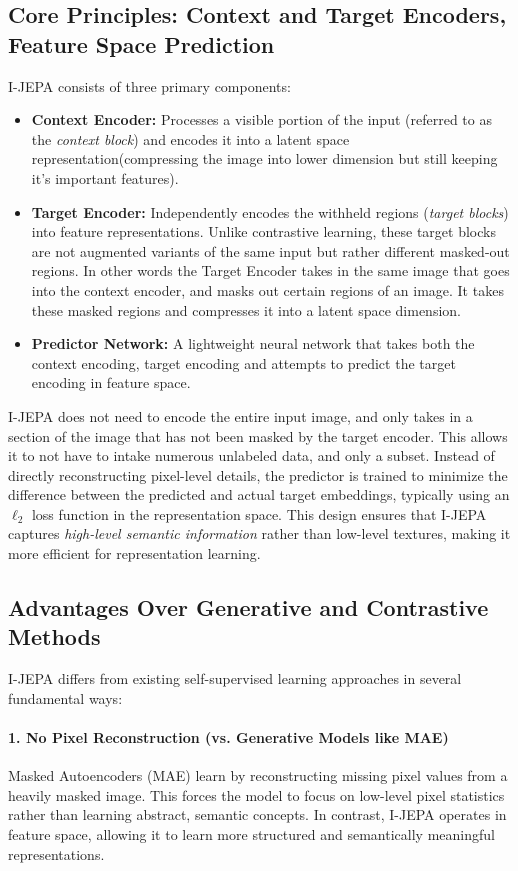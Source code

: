 \documentclass{article}
\begin{document}
\subsection{Core Principles: Context and Target Encoders, Feature Space Prediction}
I-JEPA consists of three primary components:
\begin{itemize}
    \item \textbf{Context Encoder:} Processes a visible portion of the input (referred to as the \textit{context block}) and encodes it into a latent space representation(compressing the image into lower dimension but still keeping it's important features).
    \item \textbf{Target Encoder:} Independently encodes the withheld regions (\textit{target blocks}) into feature representations. Unlike contrastive learning, these target blocks are not augmented variants of the same input but rather different masked-out regions. In other words the Target Encoder takes in the same image that goes into the context encoder, and masks out certain regions of an image. It takes these masked regions and compresses it into a latent space dimension. 
    \item \textbf{Predictor Network:} A lightweight neural network that takes both the context encoding, target encoding and attempts to predict the target encoding in feature space. 
\end{itemize}

I-JEPA does not need to encode the entire input image, and only takes in a section of the image that has not been masked by the target encoder. This allows it to not have to intake numerous unlabeled data, and only a subset. Instead of directly reconstructing pixel-level details, the predictor is trained to minimize the difference between the predicted and actual target embeddings, typically using an $\ell_2$ loss function in the representation space. This design ensures that I-JEPA captures \textit{high-level semantic information} rather than low-level textures, making it more efficient for representation learning.

\subsection{Advantages Over Generative and Contrastive Methods}
I-JEPA differs from existing self-supervised learning approaches in several fundamental ways:

\paragraph{1. No Pixel Reconstruction (vs. Generative Models like MAE)} Masked Autoencoders (MAE) \citep{he2022masked} learn by reconstructing missing pixel values from a heavily masked image. This forces the model to focus on low-level pixel statistics rather than learning abstract, semantic concepts. In contrast, I-JEPA operates in feature space, allowing it to learn more structured and semantically meaningful representations.
\end{document}
